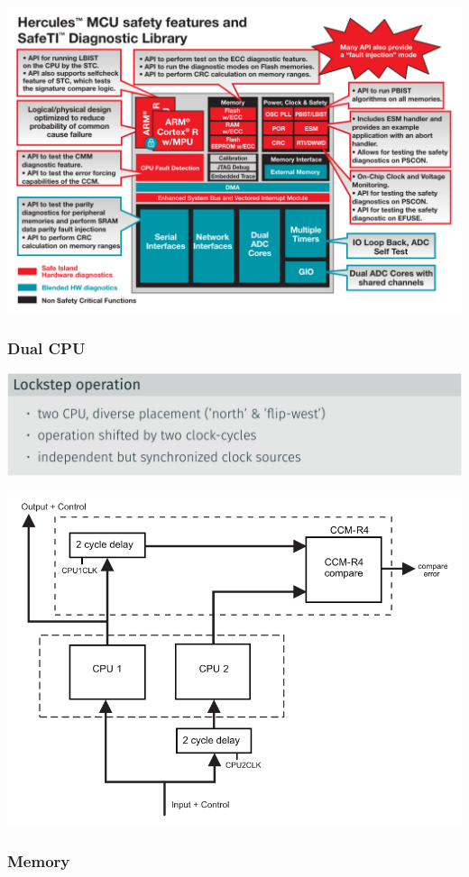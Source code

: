 \documentclass[
  10pt,
  a4paper,
  twocolumn]{article}
\begin{document}
\includegraphics{images/safety/image-22.png}

\subsubsection{Dual CPU}\label{dual-cpu}

\includegraphics{images/safety/image-26.png}

\includegraphics{images/safety/image-23.png}

\subsubsection{Memory}\label{memory}
\end{document}
